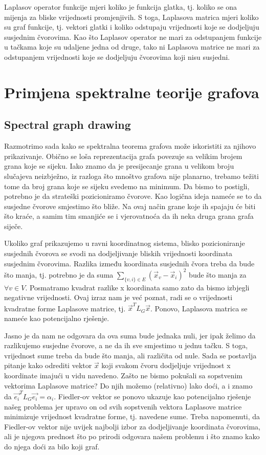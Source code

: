 \documentclass[11pt]{article}
\begin{document}
	Laplasov operator funkcije mjeri koliko je funkcija glatka, tj. koliko se ona mijenja za bliske vrijednosti promjenjivih.
	S toga, Laplasova matrica mjeri koliko su graf funkcije, tj. vektori glatki i koliko odstupaju vrijednosti koje se dodjeljuju susjednim čvorovima.
	Kao što Laplasov operator ne mari za odstupanjem funkcije u tačkama koje su udaljene jedna od druge, tako ni Laplasova matrice ne mari za odstupanjem vrijednosti koje se dodjeljuju čvorovima koji nisu susjedni.
	
	\section{Primjena spektralne teorije grafova}

	    \subsection{Spectral graph drawing}

	Razmotrimo sada kako se spektralna teorema grafova može iskoristiti za njihovo prikazivanje. 
	Obično se loša reprezentacija grafa povezuje sa velikim brojem grana koje se sijeku.
	Iako znamo da je presijecanje grana u velikom broju slučajeva neizbježno, iz razloga što mnoštvo grafova nije planarno,
	trebamo težiti tome da broj grana koje se sijeku svedemo na minimum.
    Da bismo to postigli, potrebno je da strateški pozicioniramo čvorove.
	Kao logična ideja nameće se to da susjedne čvorove smjestimo što bliže.
	Na ovaj način grane koje ih spajaju će biti što kraće, a samim tim smanjiće se i vjerovatnoća da ih neka druga grana grafa siječe.
    
	Ukoliko graf prikazujemo u ravni koordinatnog sistema, blisko pozicioniranje susjednih čvorova se svodi na dodjeljivanje bliskih vrijednosti koordinata susjednim čvorovima.
    Razlika između koordinata susjednih čvora treba da bude što manja, tj. potrebno je da suma $\sum_{\{v,i\} \in E} (\vec{x}_v - \vec{x}_i)^2$ bude što manja za $\forall v \in V$.
	Posmatramo kvadrat razlike x koordinata samo zato da bismo izbjegli negativne vrijednosti.
    Ovaj izraz nam je već poznat, radi se o vrijednosti kvadratne forme Laplasove matrice, tj. $\vec{x}^T L_G \vec{x}$. Ponovo, Laplasova matrica se nameće kao potencijalno rješenje.

    Jasno je da nam ne odgovara da ova suma bude jednaka nuli, jer ipak želimo da razlikujemo susjedne čvorove, a ne da ih sve smjestimo u jednu tačku. S toga, vrijednost sume treba da bude što manja, ali različita od nule.
    Sada se postavlja pitanje kako odrediti vektor $\vec{x}$ koji svakom čvoru dodjeljuje vrijednost x koordinate imajući u vidu navedeno. 
	Zašto ne bismo pokušali sa sopstvenim vektorima Laplasove matrice?
    Do njih možemo (relativno) lako doći, a i znamo da $\vec{e_i}^T L_G \vec{e_i} = \alpha_i$.
	Fiedler-ov vektor se ponovo ukazuje kao potencijalno rješenje našeg problema jer upravo on od svih sopstvenih vektora Laplasove matrice minimizuje vrijednost kvadratne forme, tj. navedene sume.
    Treba napomenuti, da Fiedler-ov vektor nije uvijek najbolji izbor za dodjeljivanje koordinata čvorovima, ali je njegova prednost što po prirodi odgovara našem problemu i što znamo kako do njega doći za bilo koji graf.
    
\end{document}
